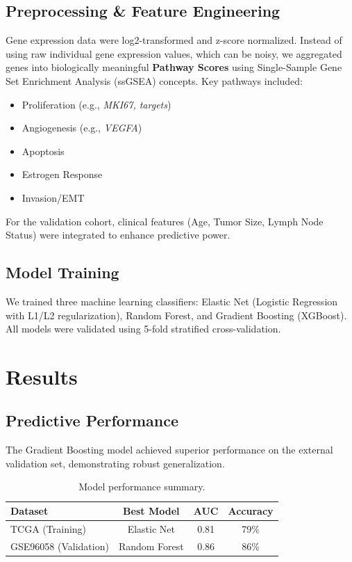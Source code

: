 \documentclass{article}
\begin{document}
\subsection{Preprocessing \& Feature Engineering}
Gene expression data were log2-transformed and z-score normalized. Instead of using raw individual gene expression values, which can be noisy, we aggregated genes into biologically meaningful \textbf{Pathway Scores} using Single-Sample Gene Set Enrichment Analysis (ssGSEA) concepts. Key pathways included:
\begin{itemize}
    \item Proliferation (e.g., \textit{MKI67, targets})
    \item Angiogenesis (e.g., \textit{VEGFA})
    \item Apoptosis
    \item Estrogen Response
    \item Invasion/EMT
\end{itemize}
For the validation cohort, clinical features (Age, Tumor Size, Lymph Node Status) were integrated to enhance predictive power.

\subsection{Model Training}
We trained three machine learning classifiers: Elastic Net (Logistic Regression with L1/L2 regularization), Random Forest, and Gradient Boosting (XGBoost). All models were validated using 5-fold stratified cross-validation.

\section{Results}

\subsection{Predictive Performance}
The Gradient Boosting model achieved superior performance on the external validation set, demonstrating robust generalization.

\begin{table}[h]
\centering
\begin{tabular}{lccc}
\toprule
\textbf{Dataset} & \textbf{Best Model} & \textbf{AUC} & \textbf{Accuracy} \\
\midrule
TCGA (Training) & Elastic Net & 0.81 & 79\% \\
GSE96058 (Validation) & Random Forest & 0.86 & 86\% \\
\bottomrule
\end{tabular}
\caption{Model performance summary.}
\end{table}
\end{document}
